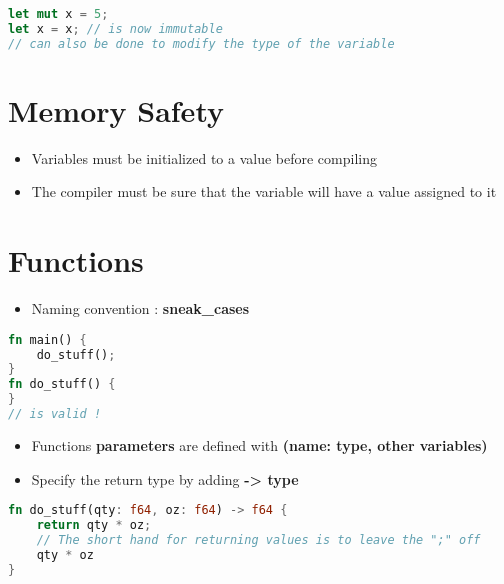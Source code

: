 \documentclass{report}
\begin{document}
\begin{tcolorbox}[title=Shadowing in the same scope,colback=backcolour]
\begin{lstlisting}[language=rust]
let mut x = 5;
let x = x; // is now immutable
// can also be done to modify the type of the variable
\end{lstlisting}
\end{tcolorbox}

\section{Memory Safety}
\begin{itemize}
	\item Variables must be initialized to a value before compiling 
	\item The compiler must be sure that the variable will have a value assigned to it
\end{itemize}


\section{Functions}

\begin{itemize}
	\item Naming convention : \textbf{sneak\_cases}
\end{itemize}

\begin{tcolorbox}[title=Functions doesn't have to appear before we call them,colback=backcolour]
\begin{lstlisting}[language=rust]
fn main() {
	do_stuff();
}
fn do_stuff() {
}
// is valid !
\end{lstlisting}
\end{tcolorbox}

\begin{itemize}
	\item Functions \textbf{parameters} are defined with \textbf{(name: type, other variables)} 
	\item Specify the return type by adding \textbf{-> type}  
\end{itemize}

\begin{tcolorbox}[colback=backcolour]
\begin{lstlisting}[language=rust]
fn do_stuff(qty: f64, oz: f64) -> f64 {
	return qty * oz;
	// The short hand for returning values is to leave the ";" off
	qty * oz
}
\end{lstlisting}
\end{tcolorbox}
\end{document}
